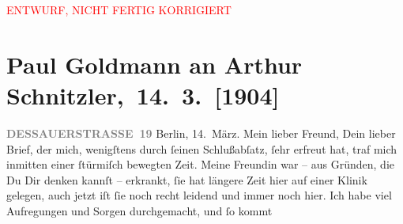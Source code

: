 
\begin{center}
            \textcolor{red}{ENTWURF, NICHT FERTIG KORRIGIERT}
                      \end{center}
            
         
         \renewcommand{\erwaehntePersonen}{Personen: Paul Goldmann, Theodore Rottenberg, Olga Schnitzler, Heinrich Schnitzler}
         \renewcommand{\erwaehnteOrte}{Orte: Berlin, Dessauer Straße, Deutsches Theater Berlin, Italien, Neapel, Palermo, Pompei, Rom, Sizilien, Taormina, Wien}
         \renewcommand{\erwaehnteWerke}{Werke: Berliner Theater. »Der einsame Weg«. Von Arthur Schnitzler, Der einsame Weg. Schauspiel in fünf Akten, Neue Freie Presse}
               \section[ Paul Goldmann an Arthur Schnitzler, 14. 3. {[}1904{]}]{ Paul Goldmann an Arthur Schnitzler, 14. 3. {[}1904{]}}\nopagebreak{}\rehead{ }\begin{ledgroupsized}[t]{13cm}\normalsize\beginnumbering{} \toendnotes[C]{\smallbreak\pagebreak[2]} 
\toendnotes[C]{\smallbreak}\pstart
           \noindent{}\raggedleft{}{\pb}\textcolor{gray}{\textbf{DESSAUERSTRASSE 19}}\pend
           \pstart
           Berlin, 14. März.\pend
           \pstart{}Mein lieber Freund,\pend\pstart
           Dein lieber Brief, der mich, wenigſtens durch ſeinen Schlußabſatz, ſehr erfreut hat,
               traf mich inmitten einer ſtürmiſch  bewegten Zeit.
               Meine Freundin war – aus
               Gründen, die Du Dir denken kannſt – erkrankt,  ſie
               hat längere Zeit hier auf einer Klinik gelegen, auch jetzt iſt ſie noch recht leidend
               und immer noch hier. Ich habe viel Aufregungen und Sorgen durchgemacht, und ſo kommt

\end{ledgroupsized}
